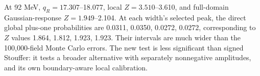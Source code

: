 At 92 MeV, $q_R=17.307$--18.077, local $Z=3.510$--3.610, and full-domain Gaussian-response $Z=1.949$--2.104. At each width's selected peak, the direct global plus-one probabilities are 0.0311, 0.0350, 0.0272, 0.0272, corresponding to $Z$ values 1.864, 1.812, 1.923, 1.923. Their intervals are much wider than the 100,000-field Monte Carlo errors. The new test is less significant than signed Stouffer: it tests a broader alternative with separately nonnegative amplitudes, and its own boundary-aware local calibration.
